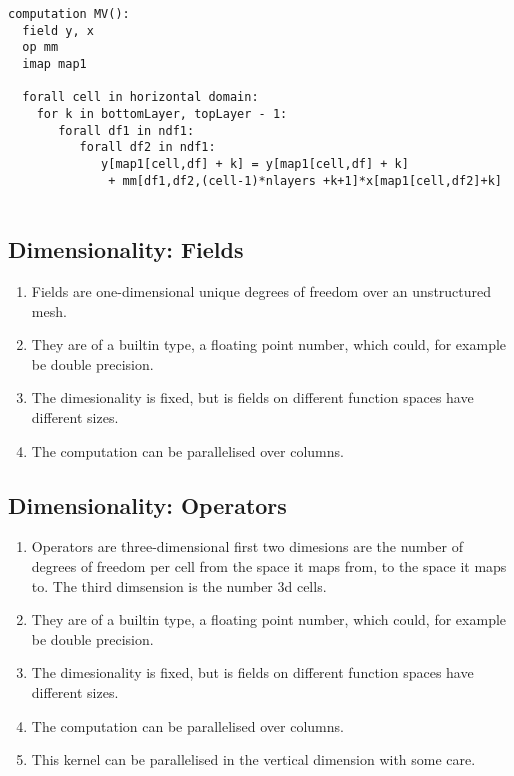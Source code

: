 \documentclass{report}
\begin{document}
\begin{lstlisting}[style=dsl]
computation MV():
  field y, x
  op mm
  imap map1

  forall cell in horizontal domain:
    for k in bottomLayer, topLayer - 1:
       forall df1 in ndf1:
          forall df2 in ndf1:
             y[map1[cell,df] + k] = y[map1[cell,df] + k] 
              + mm[df1,df2,(cell-1)*nlayers +k+1]*x[map1[cell,df2]+k]


\end{lstlisting}
\subsection{Dimensionality: Fields}
\begin{enumerate}
  \item Fields are one-dimensional unique degrees of freedom over an unstructured mesh. 
  \item They are of a builtin type, a floating point number, which could, for example be double precision. 
   \item The dimesionality is fixed, but is fields on different function spaces have different sizes. 
   \item The computation can be parallelised over columns. 
\end{enumerate}

\subsection{Dimensionality: Operators}
\begin{enumerate}
  \item Operators are three-dimensional first two dimesions are the number of degrees of freedom per cell from the space it maps from, to the space it maps to. The third dimsension is the number 3d cells.
  \item They are of a builtin type, a floating point number, which could, for example be double precision. 
   \item The dimesionality is fixed, but is fields on different function spaces have different sizes. 
   \item The computation can be parallelised over columns. 
   \item This kernel can be parallelised in the vertical dimension with some care.
\end{enumerate}
\end{document}
